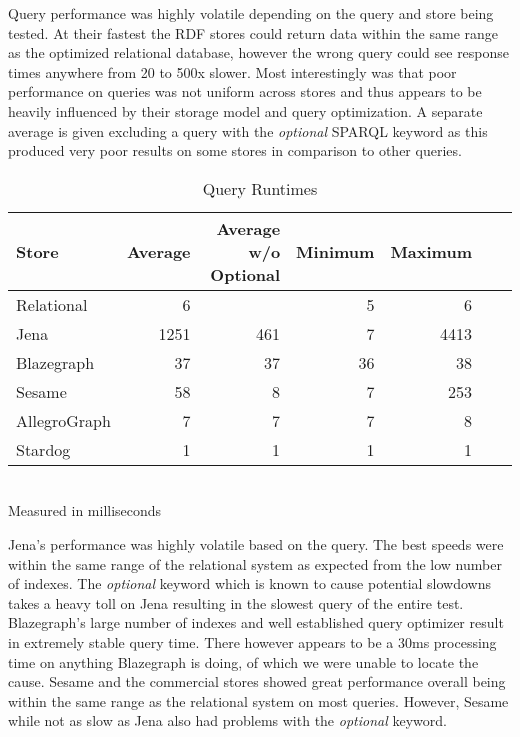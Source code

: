 \documentclass{llncs}
\begin{document}
Query performance was highly volatile depending on the query and store being tested.  At their fastest the RDF stores could return data within the same range as the optimized relational database, however the wrong query could see response times anywhere from 20 to 500x slower.  Most interestingly was that poor performance on queries was not uniform across stores and thus appears to be heavily influenced by their storage model and query optimization. A separate average is given excluding a query with the \emph{optional} SPARQL keyword as this produced very poor results on some stores in comparison to other queries.

\vspace{-1.5em}
\begin{table}
\begin{center}
\caption{Query Runtimes}
\begin{tabular}{l | r | r | r | r | r | r}
    Store & Average & Average w/o Optional & Minimum & Maximum \\
\hline
Relational & 6 &  & 5 & 6 \\
Jena & 1251 & 461 & 7 & 4413  \\
Blazegraph & 37 & 37 & 36 & 38 \\
Sesame & 58 & 8 & 7 & 253  \\
AllegroGraph & 7 & 7 & 7 & 8 \\
Stardog & 1 & 1 & 1 & 1 \\
\end{tabular}
\\[5pt]
Measured in milliseconds
\end{center}
\end{table}
\vspace{-2em}

Jena's performance was highly volatile based on the query.  The best speeds were within the same range of the relational system as expected from the low number of indexes.  The \emph{optional} keyword which is known to cause potential slowdowns takes a heavy toll on Jena resulting in the slowest query of the entire test. Blazegraph's large number of indexes and well established query optimizer result in extremely stable query time. There however appears to be a 30ms processing time on anything Blazegraph is doing, of which we were unable to locate the cause. Sesame and the commercial stores showed great performance overall being within the same range as the relational system on most queries.  However, Sesame while not as slow as Jena also had problems with the \emph{optional} keyword.
\end{document}
